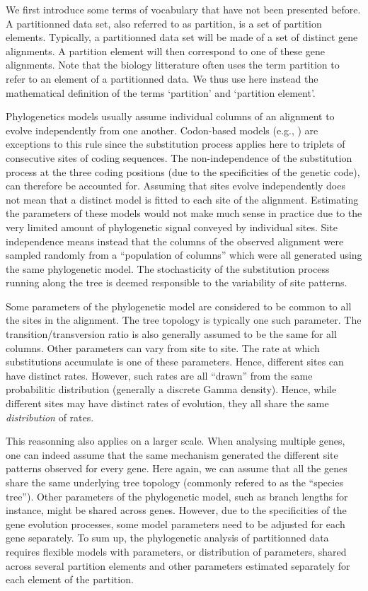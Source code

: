 \documentclass[a4paper,12pt]{article}
\begin{document}
We first introduce some terms of vocabulary that have not been presented before. A partitionned data
set, also referred to as partition, is a  set of partition elements.  Typically, a partitionned data
set will be made of  a set of distinct gene alignments. A partition  element will then correspond to
one of  these gene alignments. Note  that the biology litterature  often uses the term  partition to
refer to an element of a partitionned data.  We thus use here instead the mathematical definition of
the terms `partition' and `partition element'.

Phylogenetics models usually assume individual columns  of an alignment to evolve independently from
one  another. Codon-based  models (e.g.,  \cite{yang98,yang00b,yang02,guindon04}) are  exceptions to
this rule  since the substitution process  applies here to  triplets of consecutive sites  of coding
sequences.  The non-independence of  the substitution process at the three  coding positions (due to
the specificities of the genetic code), can  therefore be accounted for.  Assuming that sites evolve
independently  does not  mean  that a  distinct  model is  fitted  to each  site  of the  alignment.
Estimating the  parameters of these  models would not  make much sense in  practice due to  the very
limited amount of phylogenetic signal conveyed by individual sites.  Site independence means instead
that the columns  of the observed alignment  were sampled randomly from a  ``population of columns''
which were all generated  using the same phylogenetic model.  The  stochasticity of the substitution
process running along the tree is deemed responsible to the variability of site patterns.

Some parameters  of the  phylogenetic model  are considered  to be common  to all  the sites  in the
alignment. The tree topology is typically  one such parameter.  The transition/transversion ratio is
also generally assumed to be the same for all columns.  Other parameters can vary from site to site.
The rate at  which substitutions accumulate is  one of these parameters. Hence,  different sites can
have distinct rates. However,  such rates are all ``drawn'' from  the same probabilitic distribution
(generally a  discrete Gamma  density).  Hence,  while different  sites may  have distinct  rates of
evolution, they all share the same {\em distribution} of rates.

This reasonning  also applies on a  larger scale. When  analysing multiple genes, one  can indeed
assume that the same  mechanism generated the different site patterns observed  for every gene. Here
again, we can assume that all the genes share the same underlying tree topology (commonly refered to
as the ``species  tree'').  Other parameters of  the phylogenetic model, such as  branch lengths for
instance, might  be shared across  genes. However,  due to the  specificities of the  gene evolution
processes, some  model parameters  need to be  adjusted for  each gene separately.   To sum  up, the
phylogenetic analysis of partitionned data requires flexible models with parameters, or distribution
of parameters,  shared across several partition  elements and other parameters  estimated separately
for each element of the partition.
\end{document}
